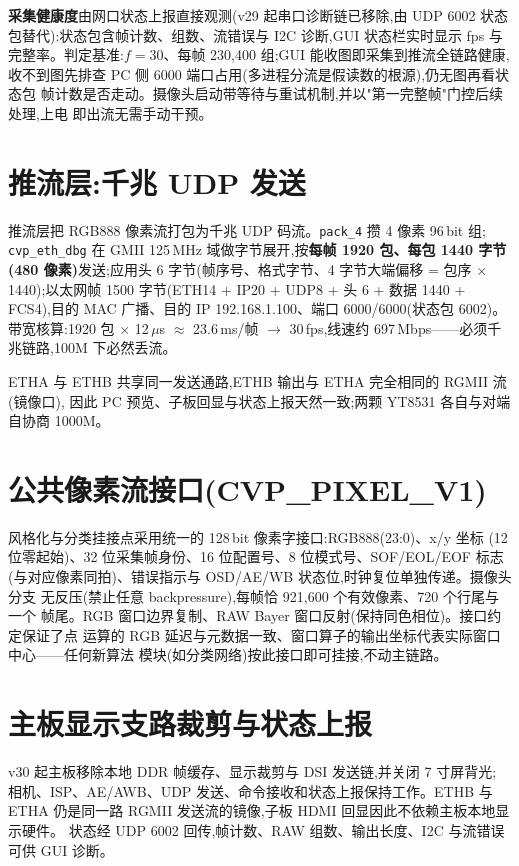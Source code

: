 \textbf{采集健康度}由网口状态上报直接观测(v29 起串口诊断链已移除,由 UDP 6002
状态包替代):状态包含帧计数、组数、流错误与 I2C 诊断,GUI 状态栏实时显示 fps 与
完整率。判定基准:$f=30$、每帧 230{,}400 组;GUI 能收图即采集到推流全链路健康,
收不到图先排查 PC 侧 6000 端口占用(多进程分流是假读数的根源),仍无图再看状态包
帧计数是否走动。摄像头启动带等待与重试机制,并以"第一完整帧"门控后续处理,上电
即出流无需手动干预。

\section{推流层:千兆 UDP 发送}

推流层把 RGB888 像素流打包为千兆 UDP 码流。\verb|pack_4| 攒 4 像素 96\,bit 组;
\verb|cvp_eth_dbg| 在 GMII 125\,MHz 域做字节展开,按\textbf{每帧 1920 包、每包
1440 字节(480 像素)}发送;应用头 6 字节(帧序号、格式字节、4 字节大端偏移 =
包序 $\times$ 1440);以太网帧 1500 字节(ETH14 + IP20 + UDP8 + 头 6 + 数据
1440 + FCS4),目的 MAC 广播、目的 IP 192.168.1.100、端口 6000/6000(状态包
6002)。带宽核算:1920 包 $\times$ 12\,$\mu$s $\approx$ 23.6\,ms/帧 $\to$
30\,fps,线速约 697\,Mbps——必须千兆链路,100M 下必然丢流。

ETHA 与 ETHB 共享同一发送通路,ETHB 输出与 ETHA 完全相同的 RGMII 流(镜像口),
因此 PC 预览、子板回显与状态上报天然一致;两颗 YT8531 各自与对端自协商 1000M。

\section{公共像素流接口(CVP\_PIXEL\_V1)}

风格化与分类挂接点采用统一的 128\,bit 像素字接口:RGB888(23:0)、x/y 坐标
(12 位零起始)、32 位采集帧身份、16 位配置号、8 位模式号、SOF/EOL/EOF 标志
(与对应像素同拍)、错误指示与 OSD/AE/WB 状态位,时钟复位单独传递。摄像头分支
无反压(禁止任意 backpressure),每帧恰 921{,}600 个有效像素、720 个行尾与一个
帧尾。RGB 窗口边界复制、RAW Bayer 窗口反射(保持同色相位)。接口约定保证了点
运算的 RGB 延迟与元数据一致、窗口算子的输出坐标代表实际窗口中心——任何新算法
模块(如分类网络)按此接口即可挂接,不动主链路。

\section{主板显示支路裁剪与状态上报}

v30 起主板移除本地 DDR 帧缓存、显示裁剪与 DSI 发送链,并关闭 7 寸屏背光;
相机、ISP、AE/AWB、UDP 发送、命令接收和状态上报保持工作。ETHB 与 ETHA
仍是同一路 RGMII 发送流的镜像,子板 HDMI 回显因此不依赖主板本地显示硬件。
状态经 UDP 6002 回传,帧计数、RAW 组数、输出长度、I2C 与流错误可供 GUI 诊断。


